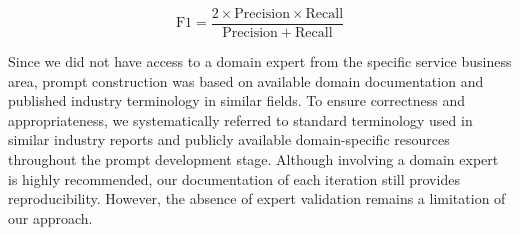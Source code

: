 $$
\mathrm{F1} = \frac{2 \times \mathrm{Precision} \times \mathrm{Recall}}
{\mathrm{Precision} + \mathrm{Recall}}
$$


Since we did not have access to a domain expert from the specific service business area, prompt construction was based on available domain documentation and published industry terminology in similar fields. To ensure correctness and appropriateness, we systematically referred to standard terminology used in similar industry reports and publicly available domain-specific resources throughout the prompt development stage. Although involving a domain expert is highly recommended, our documentation of each iteration still provides reproducibility. However, the absence of expert validation remains a limitation of our approach.